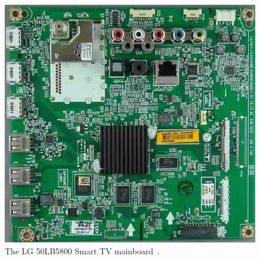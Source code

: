 \documentclass[12pt, letterpaper]{article}
\begin{document}
\begin{figure}[H]
\medskip
\centering
\includegraphics[width=1\linewidth]{EBT62999602}
\caption{The LG 50LB5800 Smart TV mainboard~\autocite{tv-parts-canada-2024}.}
\medskip
\label{fig:EBT62999602}
\end{figure}

\printbibliography[heading=bibintoc,title=References]
\end{document}
